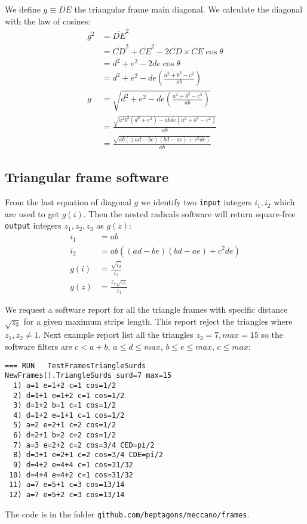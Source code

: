 \documentclass[11pt]{article}
\newenvironment{MyColorPar}[1]{
    \leavevmode\color{#1}\ignorespaces
}{
}
\begin{document}
We define $g \equiv \overline{DE}$ the triangular frame main diagonal.
We calculate the diagonal with the law of cosines:
\begin{align}
g^2 &= \overline{DE}^2 \nonumber\\
 &= \overline{CD}^2 + \overline{CE}^2
 - 2\overline{CD} \times \overline{CE}\cos\theta \nonumber\\
 &= d^2 + e^2 - 2de\cos\theta \nonumber\\
 &= d^2 + e^2 - de\left(\frac{a^2 + b^2 - c^2}{ab}\right) \nonumber\\
g &= \sqrt{d^2 + e^2 - de\left(\frac{a^2 + b^2 - c^2}{ab}\right)}\nonumber\\
 &= \frac{\sqrt{a^2b^2(d^2 + e^2) - abde(a^2 + b^2 - c^2)}}{ab}\nonumber\\
 &= \frac{\sqrt{ab((ad-be)(bd-ae)+c^2de)}}{ab}
\end{align}

\subsection{Triangular frame software}

From the last equation of diagonal $g$ we identify two \texttt{input} integers $i_1,i_2$ which are used to get $g(i)$. Then the nested radicals software will return square-free \texttt{output} integers $z_1,z_2,z_3$ as $g(z)$:
\begin{align}
i_1 &= ab \\
i_2 &= ab((ad-be)(bd-ae)+c^2de) \\
g(i) &= \frac{\sqrt{i_2}}{i_1} \\
g(z) &= \frac{z_2\sqrt{z_3}}{z_1}
\end{align}

We request a software report for all the triangle frames with specific distance $\sqrt{z_3}$
for a given maximum strips length. This report reject the triangles where $z_1,z_2 \neq 1$. Next example report list all the triangles $z_3 = 7, max=15$ so the software filters are $c < a+b$, $a\leq d\leq max$, $b\leq e\leq max$, $c\leq max$:

\begin{MyColorPar}{blue}
\begin{lstlisting}
=== RUN   TestFramesTriangleSurds
NewFrames().TriangleSurds surd=7 max=15
  1) a=1 e=1+2 c=1 cos=1/2
  2) d=1+1 e=1+2 c=1 cos=1/2
  3) d=1+2 b=1 c=1 cos=1/2
  4) d=1+2 e=1+1 c=1 cos=1/2
  5) a=2 e=2+1 c=2 cos=1/2
  6) d=2+1 b=2 c=2 cos=1/2
  7) a=3 e=2+2 c=2 cos=3/4 CED=pi/2
  8) d=3+1 e=2+1 c=2 cos=3/4 CDE=pi/2
  9) d=4+2 e=4+4 c=1 cos=31/32
 10) d=4+4 e=4+2 c=1 cos=31/32
 11) a=7 e=5+1 c=3 cos=13/14
 12) a=7 e=5+2 c=3 cos=13/14
\end{lstlisting}

The code is in the folder \texttt{github.com/heptagons/meccano/frames}.
\\
\end{MyColorPar}
\end{document}

